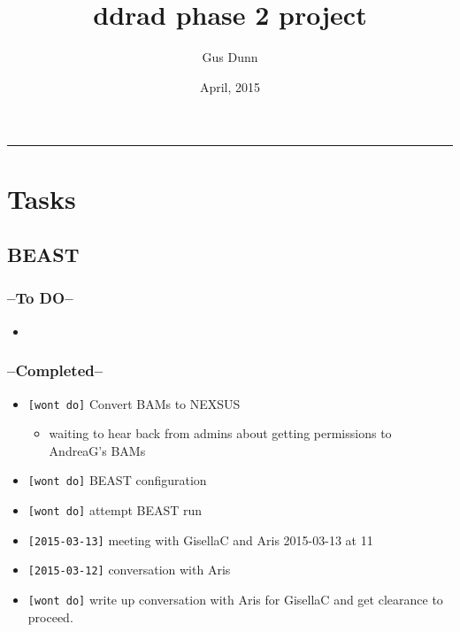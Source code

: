 \documentclass[letterpaper]{scrartcl}
\title{ddrad phase 2 project\\\vspace{0.5em}{\large Caccone PostDoc}}
\author{Gus Dunn}
\date{April, 2015}
\begin{document}
\maketitle

{
\hypersetup{linkcolor=black}
\setcounter{tocdepth}{3}
\tableofcontents
}
\begin{center}\rule{0.5\linewidth}{\linethickness}\end{center}

\newpage

\section{Tasks}\label{tasks}

\subsection{BEAST}\label{beast}

\subsubsection{--To DO--}\label{to-do}

\begin{itemize}
\item
\end{itemize}

\subsubsection{--Completed--}\label{completed}

\begin{itemize}
\itemsep1pt\parskip0pt
\item
  \texttt{{[}wont do{]}} Convert BAMs to NEXSUS

  \begin{itemize}
  \itemsep1pt\parskip0pt
  \item
    waiting to hear back from admins about getting permissions to
    AndreaG's BAMs
  \end{itemize}
\item
  \texttt{{[}wont do{]}} BEAST configuration
\item
  \texttt{{[}wont do{]}} attempt BEAST run
\item
  \texttt{{[}2015-03-13{]}} meeting with GisellaC and Aris 2015-03-13 at
  11
\item
  \texttt{{[}2015-03-12{]}} conversation with Aris
\item
  \texttt{{[}wont do{]}} write up conversation with Aris for GisellaC
  and get clearance to proceed.
\end{itemize}
\end{document}
